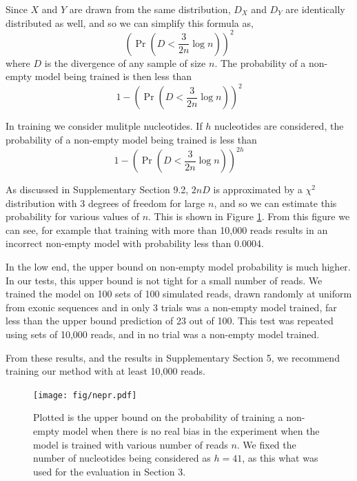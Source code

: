 \documentclass[letterpaper]{article}
\begin{document}
Since $X$ and $Y$ are drawn from the same distribution, $D_{X}$ and $D_{Y}$ are
identically distributed as well, and so we can simplify this formula as,
$$ (\Pr(D < \frac{3}{2n} \log n))^2 $$
where $D$ is the divergence of any sample of size $n$. The probability of a
non-empty model being trained is then less than
$$ 1 - (\Pr(D < \frac{3}{2n} \log n))^2 $$

In training we consider mulitple nucleotides. If $h$ nucleotides are considered,
the probability of a non-empty model being trained is less than
$$ 1 - (\Pr(D < \frac{3}{2n} \log n))^{2h} $$

As discussed in Supplementary Section 9.2, $2n D$ is approximated by a $\chi^2$
distribution with 3 degrees of freedom for large $n$, and so we can estimate
this probability for various values of $n$. This is shown in Figure
\ref{fig:nepr}. From this figure we can see, for example that training with more
than 10,000 reads results in an incorrect non-empty model with probability less
than 0.0004.

In the low end, the upper bound on non-empty model probability is much higher.
In our tests, this upper bound is not tight for a small number of reads. We
trained the model on 100 sets of 100 simulated reads, drawn randomly at uniform
from exonic sequences and in only 3 trials was a non-empty model trained, far
less than the upper bound prediction of 23 out of 100. This test was repeated
using sets of 10,000 reads, and in no trial was a non-empty model trained.

From these results, and the results in Supplementary Section 5, we recommend
training our method with at least 10,000 reads.


\begin{figure}[H]
\centerline{
\texttt{[image: fig/nepr.pdf]}}
\caption{Plotted is the upper bound on the probability of training a non-empty
model when there is no real bias in the experiment when the model is trained
with various number of reads $n$. We fixed the number of nucleotides being
considered as $h = 41$, as this what was used for the evaluation in Section 3.}
\label{fig:nepr}
\end{figure}






\end{document}
